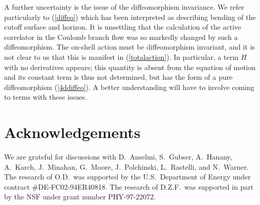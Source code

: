 \documentclass[a4paper,12pt]{article}
\begin{document}
A further uncertainty is the issue of the diffeomorphism
invariance.  We refer particularly to (\ref{diffeo}) which has been
interpreted as describing \cite{tanaka,gkr} bending of the
cutoff surface and horizon. It is unsettling that the calculation of
the active correlator in the Coulomb branch flow was so markedly
changed by such a diffeomorphism.  The on-shell action must be
diffeomorphism invariant, and it is not clear to us that this is
manifest in (\ref{totalaction}).  In particular, a term $H$ with no
derivatives appears; this quantity is absent from the equation of
motion and its constant term is thus not determined, but has the form
of a pure diffeomorphism (\ref{4ddiffeo}).  A better understanding
will have to involve coming to terms with these issues.

\section*{Acknowledgements}

We are grateful for discussions with D.~Anselmi, S.~Gubser, A.~Hanany,
A.~Karch, J.~Minahan, G.~Moore, J.~Polchinski, L.~Rastelli, and
N.~Warner.  The research of O.D.\ was supported by the U.S.\
Department of Energy under contract \#DE-FC02-94ER40818.  The research
of D.Z.F.\ was supported in part by the NSF under grant number
PHY-97-22072.

\end{document}
